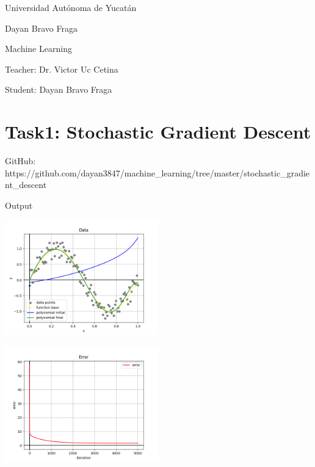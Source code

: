 \documentclass[11pt]{article}
\begin{document}
    Universidad Autónoma de Yucatán

    Dayan Bravo Fraga

    Machine Learning

    Teacher: Dr. Victor Uc Cetina

    Student: Dayan Bravo Fraga


    \section{Task1: Stochastic Gradient Descent}\label{sec:task1-stochastic-gradient-descent}

    GitHub: https://github.com/dayan3847/machine\_learning/tree/master/stochastic\_gradient\_descent

    Output

    \includegraphics[width=0.5\textwidth]{../colab/reports/20230514144011475656/result_polynomial}

    \includegraphics[width=0.5\textwidth]{../colab/reports/20230514144011475656/result_error}
\end{document}
